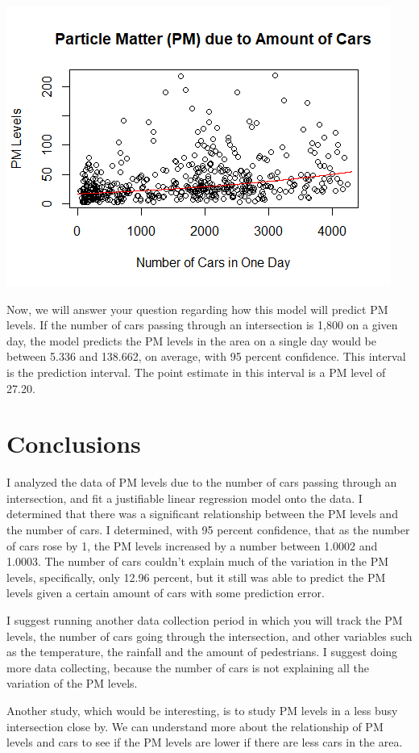\documentclass[12pt]{article}\usepackage[]{graphicx}\usepackage[]{color}
\begin{document}
\includegraphics{regression_line.png}



Now, we will answer your question regarding how this model will predict PM levels. If the number of cars passing through an intersection is 1,800 on a given day, the model predicts the PM levels in the area on a single day would be between 5.336 and 138.662, on average, with 95 percent confidence. This interval is the prediction interval. The point estimate in this interval is a PM level of 27.20. 



\section{Conclusions}

I analyzed the data of PM levels due to the number of cars passing through an intersection, and fit a justifiable linear regression model onto the data. I determined that there was a significant relationship between the PM levels and the number of cars. I determined, with 95 percent confidence, that as the number of cars rose by 1, the PM levels increased by a number between 1.0002 and 1.0003. The number of cars couldn't explain much of the variation in the PM levels, specifically, only 12.96 percent, but it still was able to predict the PM levels given a certain amount of cars with some prediction error.



I suggest running another data collection period in which you will track the PM levels, the number of cars going through the intersection, and other variables such as the temperature, the rainfall and the amount of pedestrians. I suggest doing more data collecting, because the number of cars is not explaining all the variation of the PM levels. 

Another study, which would be interesting, is to study PM levels in a less busy intersection close by. We can understand more about the relationship of PM levels and cars to see if the PM levels are lower if there are less cars in the area. 
\end{document}
